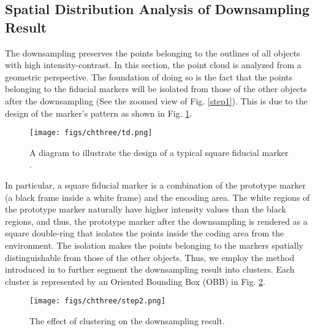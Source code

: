 \subsection{Spatial Distribution Analysis of Downsampling Result} \label{clu}
The downsampling preserves the points belonging to the outlines of all objects with high intensity-contrast. In this section, the point cloud is analyzed from a geometric perspective.
The foundation of doing so is the fact that the points belonging to the fiducial markers will be isolated from those of the other objects after the downsampling (See the zoomed view of  Fig. \ref{step1}). This is due to the design of the marker's pattern as shown in Fig. \ref{td}. 
\begin{figure}[ht] 
	\centering
\texttt{[image: figs/chthree/td.png]}
	\caption{A diagram to illustrate the design of a typical square fiducial marker \cite{ap3}. }
	\label{td}
\end{figure}\par
In particular, a square fiducial marker is a combination of the prototype marker (a black frame inside a white frame) and the encoding area. The white regions of the prototype marker naturally have higher intensity values than the black regions, and thus, the prototype marker after the downsampling is rendered as a square double-ring that isolates the points inside the coding area from the environment. The isolation makes the points belonging to the markers spatially distinguishable from those of the other objects. Thus, we employ the method introduced in \cite{rusu} to further segment the downsampling result into clusters. Each cluster is represented by an Oriented Bounding Box (OBB) in Fig. \ref{step2}. 
\begin{figure}[H] 
	\centering
\texttt{[image: figs/chthree/step2.png]}
	\caption{The effect of clustering on the downsampling result.}
	\label{step2}
\end{figure}\par

